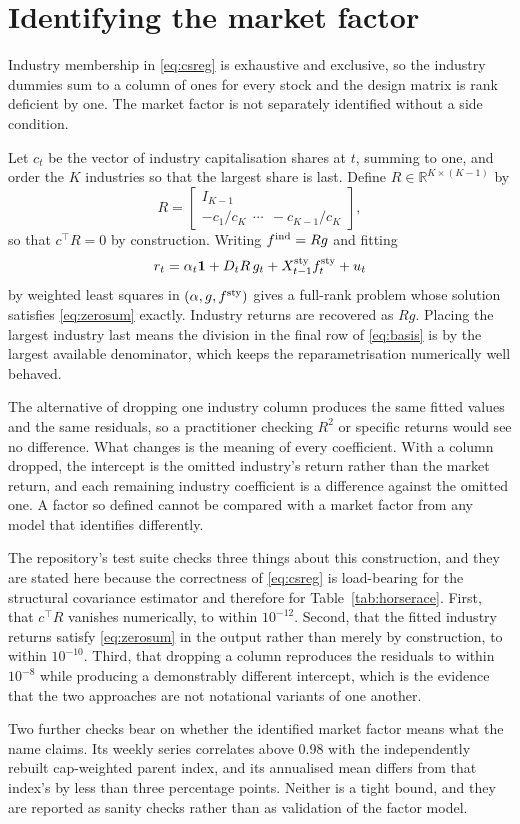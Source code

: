 \section{Identifying the market factor}
\label{app:identification}
Industry membership in \eqref{eq:csreg} is exhaustive and exclusive, so the
industry dummies sum to a column of ones for every stock and the design matrix
is rank deficient by one. The market factor is not separately identified
without a side condition.

Let $c_t$ be the vector of industry capitalisation shares at $t$, summing to
one, and order the $K$ industries so that the largest share is last. Define
$R \in \mathbb{R}^{K\times(K-1)}$ by
\begin{equation}
 R = \begin{bmatrix} I_{K-1} \\[2pt]
     -c_1/c_K \ \ \cdots \ \ -c_{K-1}/c_K \end{bmatrix},
 \label{eq:basis}
\end{equation}
so that $c^{\top}R = 0$ by construction. Writing $f^{\rm ind} = Rg$ and fitting
\begin{equation}
 r_t = \alpha_t\mathbf{1} + D_t R\,g_t + X^{\mathrm{sty}}_{t-1} f^{\rm sty}_t + u_t
 \label{eq:reparam}
\end{equation}
by weighted least squares in $(\alpha, g, f^{\rm sty})$ gives a full-rank
problem whose solution satisfies \eqref{eq:zerosum} exactly. Industry returns
are recovered as $Rg$. Placing the largest industry last means the division in
the final row of \eqref{eq:basis} is by the largest available denominator,
which keeps the reparametrisation numerically well behaved.

The alternative of dropping one industry column produces the same fitted values
and the same residuals, so a practitioner checking $R^2$ or specific returns
would see no difference. What changes is the meaning of every coefficient. With
a column dropped, the intercept is the omitted industry's return rather than
the market return, and each remaining industry coefficient is a difference
against the omitted one. A factor so defined cannot be compared with a
market factor from any model that identifies differently.

The repository's test suite checks three things about this construction, and
they are stated here because the correctness of \eqref{eq:csreg} is load-bearing
for the structural covariance estimator and therefore for
Table~\ref{tab:horserace}. First, that $c^{\top}R$ vanishes numerically, to
within $10^{-12}$. Second, that the fitted industry returns satisfy
\eqref{eq:zerosum} in the output rather than merely by construction, to within
$10^{-10}$. Third, that dropping a column reproduces the residuals to within
$10^{-8}$ while producing a demonstrably different intercept, which is the
evidence that the two approaches are not notational variants of one another.

Two further checks bear on whether the identified market factor means what the
name claims. Its weekly series correlates above 0.98 with the independently
rebuilt cap-weighted parent index, and its annualised mean differs from that
index's by less than three percentage points. Neither is a tight bound, and
they are reported as sanity checks rather than as validation of the factor
model.
